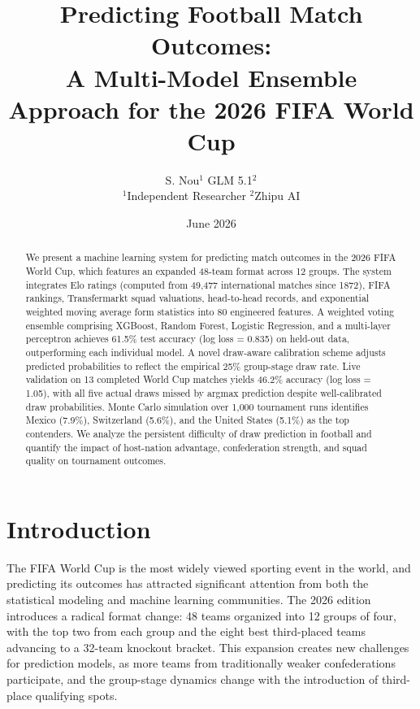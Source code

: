 \documentclass[11pt,a4paper]{article}
\title{\LARGE\textbf{Predicting Football Match Outcomes:\\A Multi-Model Ensemble Approach for the 2026 FIFA World Cup}}
\author{
  \begin{tabular}{c}
    S. Nou$^{1}$ \qquad GLM 5.1$^{2}$\\[0.5em]
    \small $^{1}$Independent Researcher \qquad $^{2}$Zhipu AI
  \end{tabular}
}
\date{June 2026}
\newcommand{\Elo}{Elo}
\begin{document}
\sloppy

\maketitle

\begin{abstract}
We present a machine learning system for predicting match outcomes in the 2026 FIFA World Cup, which features an expanded 48-team format across 12 groups. The system integrates \Elo{} ratings (computed from 49,477 international matches since 1872), FIFA rankings, Transfermarkt squad valuations, head-to-head records, and exponential weighted moving average form statistics into 80 engineered features. A weighted voting ensemble comprising XGBoost, Random Forest, Logistic Regression, and a multi-layer perceptron achieves 61.5\% test accuracy (log loss = 0.835) on held-out data, outperforming each individual model. A novel draw-aware calibration scheme adjusts predicted probabilities to reflect the empirical 25\% group-stage draw rate. Live validation on 13 completed World Cup matches yields 46.2\% accuracy (log loss = 1.05), with all five actual draws missed by argmax prediction despite well-calibrated draw probabilities. Monte Carlo simulation over 1,000 tournament runs identifies Mexico (7.9\%), Switzerland (5.6\%), and the United States (5.1\%) as the top contenders. We analyze the persistent difficulty of draw prediction in football and quantify the impact of host-nation advantage, confederation strength, and squad quality on tournament outcomes.
\end{abstract}

\section{Introduction}
\label{sec:intro}

The FIFA World Cup is the most widely viewed sporting event in the world, and predicting its outcomes has attracted significant attention from both the statistical modeling and machine learning communities. The 2026 edition introduces a radical format change: 48 teams organized into 12 groups of four, with the top two from each group and the eight best third-placed teams advancing to a 32-team knockout bracket. This expansion creates new challenges for prediction models, as more teams from traditionally weaker confederations participate, and the group-stage dynamics change with the introduction of third-place qualifying spots.
\end{document}
